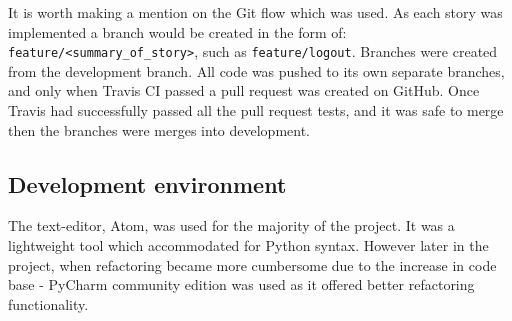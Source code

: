 It is worth making a mention on the Git flow which was used. As each story was implemented a branch would be created in the form of: \texttt{feature/<summary_of_story>}, such as \texttt{feature/logout}. Branches were created from the development branch. All code was pushed to its own separate branches, and only when Travis CI passed a pull request was created on GitHub.  Once Travis had successfully passed all the pull request tests, and it was safe to merge then the branches were merges into development.

\subsection{Development environment}
The text-editor, Atom, was used for the majority of the project. It was a lightweight tool which accommodated for Python syntax. However later in the project, when refactoring became more cumbersome due to the increase in code base - PyCharm community edition was used as it offered better refactoring functionality.
